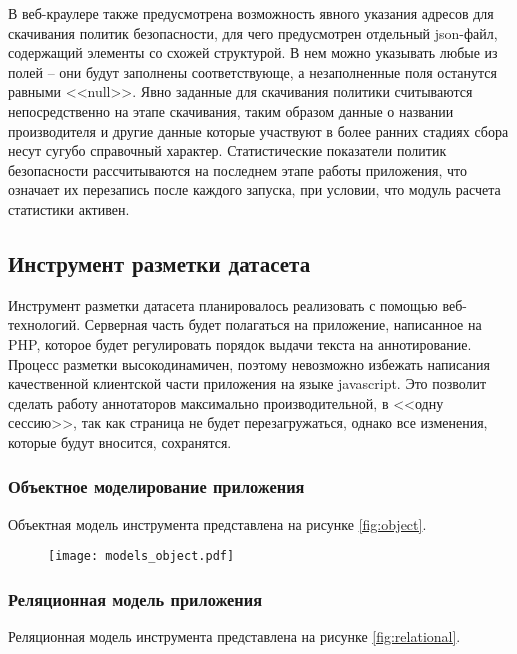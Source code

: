 \documentclass[../main]{subfiles}
\begin{document}
В веб-краулере также предусмотрена возможность явного указания адресов для скачивания политик безопасности, для чего предусмотрен отдельный json-файл, содержащий элементы со схожей структурой. В нем можно указывать любые из полей – они будут заполнены соответствующе, а незаполненные поля останутся равными <<null>>. Явно заданные для скачивания политики считываются непосредственно на этапе скачивания, таким образом данные о названии производителя и другие данные которые участвуют в более ранних стадиях сбора несут сугубо справочный характер. Статистические показатели политик безопасности рассчитываются на последнем этапе работы приложения, что означает их перезапись после каждого запуска, при условии, что модуль расчета статистики активен.

\subsection{Инструмент разметки датасета}
Инструмент разметки датасета планировалось реализовать с помощью веб-технологий. Серверная часть будет полагаться на приложение, написанное на PHP, которое будет регулировать порядок выдачи текста на аннотирование. Процесс разметки высокодинамичен, поэтому невозможно избежать написания качественной клиентской части приложения на языке javascript. Это позволит сделать работу аннотаторов максимально производительной, в <<одну сессию>>, так как страница не будет перезагружаться, однако все изменения, которые будут вносится, сохранятся.

\subsubsection{Объектное моделирование приложения}

Объектная модель инструмента представлена на рисунке \ref{fig:object}.

\begin{figure}[H]
    \centering
    {\texttt{[image: models\_object.pdf]}}
    \vspace{-\baselineskip}
\end{figure}

\subsubsection{Реляционная модель приложения}

Реляционная модель инструмента представлена на рисунке \ref{fig:relational}.
\end{document}
